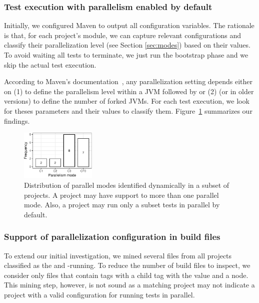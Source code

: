 \subsubsection{Test execution with parallelism enabled by default}
\label{sec:rqC-1}

Initially, we configured Maven to output all configuration variables.
The rationale is that, for each project's module, we can capture
relevant configurations and classify their parallelization level (see
Section \ref{sec:modes}) based on their values. To avoid waiting all
tests to terminate, we just run the bootstrap phase and we skip the
actual test execution.

According to Maven's documentation~\cite{maven-surefire-plugin}, any
parallelization setting depends either on (1)  to
define the parallelism level within a JVM followed by
 or (2)  (or 
in older versions) to define the number of forked JVMs. For each test
execution, we look for theses parameters and their values to classify
them.   Figure~\ref{fig:freqmodes-dynamic} summarizes our
findings.

\begin{figure}[h!]
    \centering
    \includegraphics[width=0.32\textwidth]{plots/barplot-modes-dynamic.pdf}
    \caption{\label{fig:freqmodes-dynamic}Distribution of parallel modes identified dynamically in a
    subset of \numProjectsPar{} projects.  A project may have support
    to more than one parallel mode. Also, a project may run only a
    subset tests in parallel by default.}
\end{figure}




\subsubsection{Support of parallelization configuration in build files}
\label{sec:rqC-2}

To extend our initial investigation, we mined several \pomf{} files
from all \numMedLong{} projects classified as the \medg{} and
\longg{}-running.
To reduce the number of build files
to inspect, we consider only \pomf{} files that contain
 tags with a child tag  with the
value  and a 
node. This mining step, however, is not sound as a matching project may not 
indicate a project with a valid configuration for running tests in parallel.

